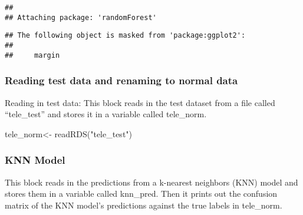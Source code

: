 \documentclass[
]{article}
\newenvironment{Shaded}{\begin{snugshade}}{\end{snugshade}}
\newcommand{\FunctionTok}[1]{\textcolor[rgb]{0.00,0.00,0.00}{#1}}
\newcommand{\NormalTok}[1]{#1}
\newcommand{\OtherTok}[1]{\textcolor[rgb]{0.56,0.35,0.01}{#1}}
\newcommand{\SpecialCharTok}[1]{\textcolor[rgb]{0.00,0.00,0.00}{#1}}
\newcommand{\StringTok}[1]{\textcolor[rgb]{0.31,0.60,0.02}{#1}}
\begin{document}
\begin{verbatim}
## 
## Attaching package: 'randomForest'
\end{verbatim}

\begin{verbatim}
## The following object is masked from 'package:ggplot2':
## 
##     margin
\end{verbatim}

\hypertarget{reading-test-data-and-renaming-to-normal-data}{%
\subsubsection{Reading test data and renaming to normal
data}\label{reading-test-data-and-renaming-to-normal-data}}

Reading in test data: This block reads in the test dataset from a file
called ``tele\_test'' and stores it in a variable called tele\_norm.

\begin{Shaded}
\begin{Highlighting}[]
\NormalTok{tele\_norm}\OtherTok{\textless{}{-}} \FunctionTok{readRDS}\NormalTok{(}\StringTok{"tele\_test"}\NormalTok{)}
\end{Highlighting}
\end{Shaded}

\hypertarget{knn-model}{%
\subsubsection{KNN Model}\label{knn-model}}

This block reads in the predictions from a k-nearest neighbors (KNN)
model and stores them in a variable called knn\_pred. Then it prints out
the confusion matrix of the KNN model's predictions against the true
labels in tele\_norm.

\begin{Shaded}
\end{Shaded}
\end{document}
